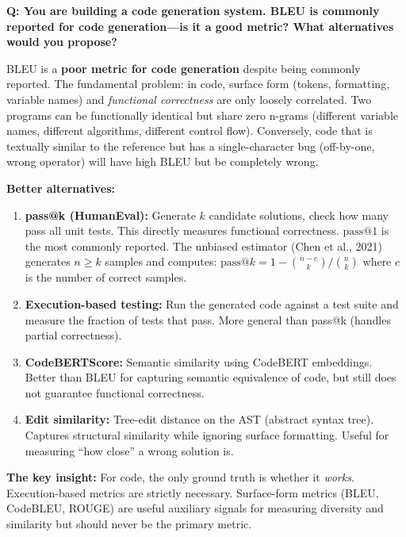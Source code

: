 \begin{interviewq}
\textbf{Q: You are building a code generation system. BLEU is commonly reported
for code generation---is it a good metric? What alternatives would you propose?}

 \quad {} \quad \badgefreq{\freqmed}

\stronganswer
BLEU is a \textbf{poor metric for code generation} despite being commonly
reported.  The fundamental problem: in code, surface form (tokens, formatting,
variable names) and \emph{functional correctness} are only loosely correlated.
Two programs can be functionally identical but share zero n-grams (different
variable names, different algorithms, different control flow).  Conversely, code
that is textually similar to the reference but has a single-character bug
(off-by-one, wrong operator) will have high BLEU but be completely wrong.

\textbf{Better alternatives:}

\begin{enumerate}
    \item \textbf{pass@k (HumanEval):} Generate $k$ candidate solutions, check
          how many pass all unit tests.  This directly measures functional
          correctness.  $\text{pass@}1$ is the most commonly reported.  The
          unbiased estimator (Chen et al., 2021) generates $n \geq k$ samples
          and computes: $\text{pass@}k = 1 - \binom{n-c}{k}/\binom{n}{k}$
          where $c$ is the number of correct samples.

    \item \textbf{Execution-based testing:} Run the generated code against a
          test suite and measure the fraction of tests that pass.  More general
          than pass@k (handles partial correctness).

    \item \textbf{CodeBERTScore:} Semantic similarity using CodeBERT embeddings.
          Better than BLEU for capturing semantic equivalence of code, but still
          does not guarantee functional correctness.

    \item \textbf{Edit similarity:} Tree-edit distance on the AST (abstract
          syntax tree).  Captures structural similarity while ignoring surface
          formatting.  Useful for measuring ``how close'' a wrong solution is.
\end{enumerate}

\textbf{The key insight:}  For code, the only ground truth is whether it
\emph{works}.  Execution-based metrics are strictly necessary.  Surface-form
metrics (BLEU, CodeBLEU, ROUGE) are useful auxiliary signals for measuring
diversity and similarity but should never be the primary metric.


\end{interviewq}
